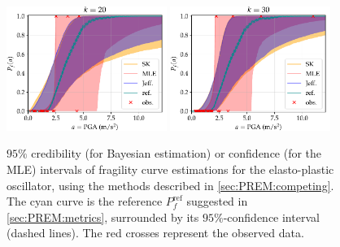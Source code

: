 \begin{figure}[h]
    \centering%
    \includegraphics[width=5.2cm]{figures/PREM/oscill/PGA20.pdf}\hspace*{0.5cm}
    \includegraphics[width=5.2cm]{figures/PREM/oscill/PGA30.pdf}
    \caption{$95\%$ credibility (for Bayesian estimation) or confidence (for the MLE) intervals of fragility curve estimations for the elasto-plastic oscillator, using the methods described in \cref{sec:PREM:competing}. %
    The cyan curve is the reference $P^\text{ref}_f$ suggested in \cref{sec:PREM:metrics}, surrounded by its $95\%$-confidence interval (dashed lines). The red crosses represent the observed data.}
    \label{fig:curvesONL}
\end{figure}


